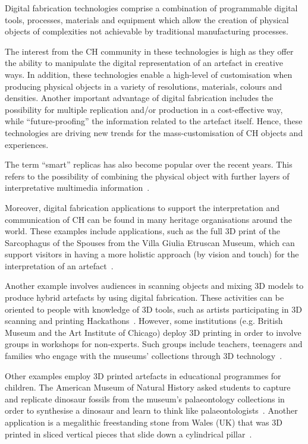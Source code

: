\documentclass[acmlarge,screen,dvipsnames]{acmart}
\begin{document}
Digital fabrication technologies comprise a combination of
programmable digital tools, processes, materials and equipment which
allow the creation of physical objects of complexities not achievable
by traditional manufacturing processes.

The interest from the CH community in these technologies is high as
they offer the ability to manipulate the digital representation of an
artefact in creative ways. In addition, these technologies enable a
high-level of customisation when producing physical objects in a
variety of resolutions, materials, colours and densities. Another
important advantage of digital fabrication includes the possibility
for multiple replication and/or production in a cost-effective way,
while ``future-proofing'' the information related to the artefact
itself. Hence, these technologies are driving new trends for the
mass-customisation of CH objects and experiences.

The term ``smart'' replicas has also become popular over the recent
years. This refers to the possibility of combining the physical object
with further layers of interpretative multimedia
information~\cite{Capurro2015,Marshall2016}.

Moreover, digital fabrication applications to support the
interpretation and communication of CH can be found in many heritage
organisations around the world. These examples include applications,
such as the full 3D print of the Sarcophagus of the Spouses from the
Villa Giulia Etruscan Museum, which can support visitors in having a
more holistic approach (by vision and touch) for the interpretation of
an artefact~\cite{Guidazzoli2014}.

Another example involves audiences in scanning objects and mixing 3D
models to produce hybrid artefacts by using digital fabrication. These
activities can be oriented to people with knowledge of 3D tools, such
as artists participating in 3D scanning and printing
Hackathons~\cite{Mullaney2012,Neely2013}. However, some institutions
(e.g. British Museum and the Art Institute of Chicago) deploy 3D
printing in order to involve groups in workshops for non-experts. Such
groups include teachers, teenagers and families who engage with the
museums' collections through 3D
technology~\cite{BritishMuseum2016,Neely2015,Miles2015}.

Other examples employ 3D printed artefacts in educational programmes
for children. The American Museum of Natural History asked students to
capture and replicate dinosaur fossils from the museum's palaeontology
collections in order to synthesise a dinosaur and learn to think like
palaeontologists~\cite{AMNH2013}. Another application is a megalithic
freestanding stone from Wales (UK) that was 3D printed in sliced
vertical pieces that slide down a cylindrical pillar~\cite{Miles2015}.
\end{document}
